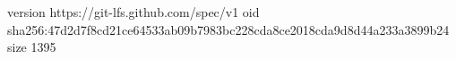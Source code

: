 version https://git-lfs.github.com/spec/v1
oid sha256:47d2d7f8cd21ce64533ab09b7983bc228cda8ce2018cda9d8d44a233a3899b24
size 1395
